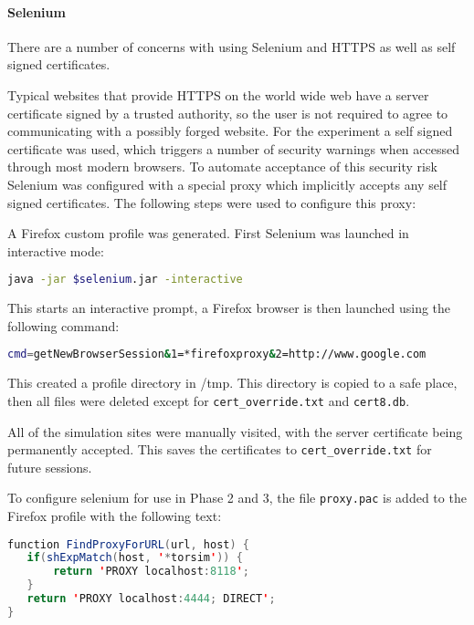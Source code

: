 

\paragraph{Selenium}

There are a number of concerns with using Selenium and HTTPS as well as self
signed certificates.

Typical websites that provide HTTPS on the world wide web have a server
certificate signed by a trusted authority, so the user is not required to agree
to communicating with a possibly forged website. For the experiment a self
signed certificate was used, which triggers a number of security warnings when
accessed through most modern browsers. To automate acceptance of this security
risk Selenium was configured with a special proxy which implicitly accepts any
self signed certificates. The following steps were used to configure this proxy:

\begin{enumerate*}
  \item A Firefox custom profile was generated. First Selenium was launched in
    interactive mode:
\begin{lstlisting}[language=sh]
java -jar $selenium.jar -interactive
\end{lstlisting}
  \item This starts an interactive prompt, a Firefox browser is then launched
    using the following command:
\begin{lstlisting}[language=sh]
cmd=getNewBrowserSession&1=*firefoxproxy&2=http://www.google.com
\end{lstlisting}
  \item This created a profile directory in /tmp. This directory is copied to a
    safe place, then all files were deleted except for \verb+cert_override.txt+
    and \verb+cert8.db+.
  \item All of the simulation sites were manually visited, with the server
    certificate being permanently accepted. This saves the certificates to
    \verb+cert_override.txt+ for future sessions.
\end{enumerate*}

To configure selenium for use in Phase 2 and 3, the file \verb+proxy.pac+ is
added to the Firefox profile with the following text:

\begin{lstlisting}[language=java]
function FindProxyForURL(url, host) {
   if(shExpMatch(host, '*torsim')) {
       return 'PROXY localhost:8118';
   }
   return 'PROXY localhost:4444; DIRECT';
}
\end{lstlisting}

